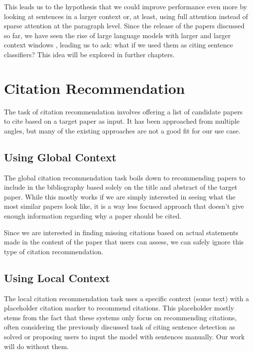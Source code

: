 \documentclass[12pt,a4paper]{report}
\begin{document}
This leads us to the hypothesis that we could improve performance even more by looking at sentences in a larger context or, at least, using full attention instead of sparse attention at the paragraph level. Since the release of the papers discussed so far, we have seen the rise of large language models with larger and larger context windows \cite{Achiam2023GPT4TR,Reid2024Gemini1U}, leading us to ask: what if we used them as citing sentence classifiers? This idea will be explored in further chapters.

\section{Citation Recommendation}

The task of citation recommendation involves offering a list of candidate papers to cite based on a target paper as input. It has been approached from multiple angles, but many of the existing approaches are not a good fit for our use case.

\subsection{Using Global Context}

The global citation recommendation \cite{Strohman2007RecommendingCF} task boils down to recommending papers to include in the bibliography based solely on the title and abstract of the target paper. While this mostly works if we are simply interested in seeing what the most similar papers look like, it is a way less focused approach that doesn't give enough information regarding why a paper should be cited.

Since we are interested in finding missing citations based on actual statements made in the content of the paper that users can assess, we can safely ignore this type of citation recommendation.

\subsection{Using Local Context}

The local citation recommendation \cite{He2010ContextawareCR} task uses a specific context (some text) with a placeholder citation marker to recommend citations. This placeholder mostly stems from the fact that these systems only focus on recommending citations, often considering the previously discussed task of citing sentence detection as solved or proposing users to input the model with sentences manually. Our work will do without them.
\end{document}

